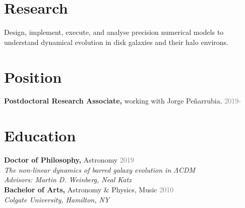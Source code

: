 \documentclass[margin, 11pt]{res} %
\begin{document}
\begin{resume}

\section{\sc \textcolor{redshade}{Research} }



Design, implement, execute, and analyse precision numerical models to understand dynamical evolution in disk galaxies and their halo environs.


\section{\sc \textcolor{redshade}{Position}}

{\bf Postdoctoral Research Associate,} working with Jorge Pe{\~n}arrubia. \hfill \textcolor{grey}{2019-}

\section{\sc \textcolor{redshade}{Education}}

{\bf Doctor of Philosophy,} Astronomy \hfill \textcolor{grey}{2019}\\
\hspace*{0.25 in} {\sl \textcolor{blueshade}{The non-linear dynamics of barred galaxy evolution in $\Lambda$CDM}}\\
\hspace*{0.25 in} {\sl Advisors: Martin D. Weinberg, Neal Katz}\\
{\bf Bachelor of Arts,} Astronomy \& Physics, Music \hfill \textcolor{grey}{2010}\\
\hspace*{0.25 in} {\sl Colgate University, Hamilton, NY}\\


\end{resume}
\end{document}
